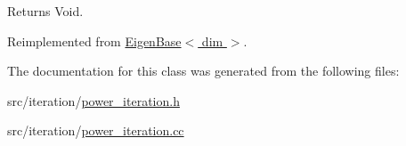 \begin{DoxyReturn}{Returns}
Void. 
\end{DoxyReturn}


Reimplemented from \hyperlink{class_eigen_base_ae09830ed4bcb14b7b699cd5f5460fab7}{Eigen\+Base$<$ dim $>$}.



The documentation for this class was generated from the following files\+:\begin{DoxyCompactItemize}
\item 
src/iteration/\hyperlink{power__iteration_8h}{power\+\_\+iteration.\+h}\item 
src/iteration/\hyperlink{power__iteration_8cc}{power\+\_\+iteration.\+cc}\end{DoxyCompactItemize}
